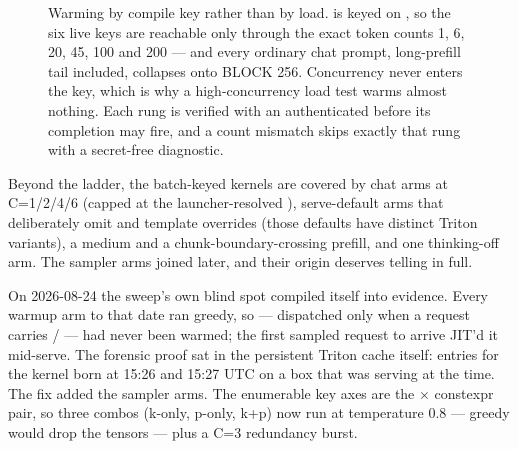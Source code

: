 \begin{figure}[htbp]
{%
}
\caption{Warming by compile key rather than by load.
 is keyed on
, so the six live keys are
reachable only through the exact token counts 1, 6, 20, 45, 100 and 200 ---
and every ordinary chat prompt, long-prefill tail included, collapses onto
BLOCK 256. Concurrency never enters the key, which is why a high-concurrency
load test warms almost nothing. Each rung is verified with an authenticated
 before its completion may fire, and a count mismatch
skips exactly that rung with a secret-free diagnostic.}
\label{fig:ops-warmup-ladder}
\end{figure}

Beyond the ladder, the batch-keyed kernels are covered by chat arms at
C=1/2/4/6 (capped at the launcher-resolved ),
serve-default arms that deliberately omit  and template
overrides (those defaults have distinct Triton variants), a medium and a
chunk-boundary-crossing prefill, and one
thinking-off arm. The sampler arms joined
later, and their origin deserves telling in full.

\begin{hbwarstory}
On 2026-08-24 the sweep's own blind spot compiled itself into evidence.
Every warmup arm to that date ran greedy, so  ---
dispatched only when a request carries / --- had
never been warmed; the first sampled request to arrive JIT'd it mid-serve.
The forensic proof sat in the persistent Triton cache itself:
entries for the kernel born at 15:26 and 15:27 UTC on a box that was
serving at the time. The fix added the sampler arms. The enumerable key
axes are the $\times$ constexpr
pair, so three combos (k-only, p-only, k+p) now run at temperature 0.8 ---
greedy would drop the tensors --- plus a C=3 redundancy burst.
\end{hbwarstory}

